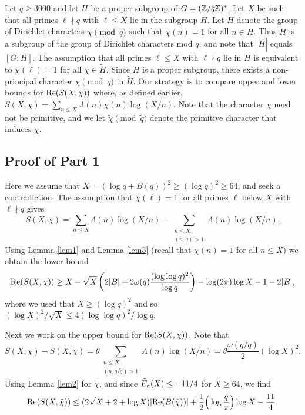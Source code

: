 \documentclass [12pt]{amsart}
\numberwithin{equation}{section}
\newcommand{\tRe}{\textup{Re}}
\begin{document}
Let $q\ge 3000$ and let $H$ be a proper subgroup of $G=({\Bbb Z}/q{\Bbb Z})^*$.  
Let $X$ be such that all primes $\ell \nmid q$ with $\ell \le X$ lie in the 
subgroup $H$.   
Let $\tilde H$ denote the group of Dirichlet characters $\chi \pmod q$ 
such that $\chi(n) =1$ for all $n \in H$.  Thus ${\tilde H}$ is a subgroup of 
the group of Dirichlet characters mod $q$, and note that $|{\tilde H}|$ equals 
$[G:H]$.  The assumption that all primes $\ell \le X$ with $\ell \nmid q$ 
lie in $H$ is equivalent to $\chi(\ell)=1$ for all $\chi \in {\tilde H}$.   Since $H$ is 
a proper subgroup, there exists a non-principal character $\chi \pmod q$ in ${\tilde H}$.  
Our strategy is to compare upper and lower bounds for $\tRe (S(X,\chi))$ where, 
as defined earlier, $S(X,\chi) = \sum_{n\le X} \Lambda(n) \chi(n) \log (X/n)$.  
Note that the character $\chi$ need not be primitive, and we let $\tilde \chi \pmod{\tilde q}$ 
denote the primitive character that induces $\chi$.   

 \subsection{Proof of Part 1}  Here we assume that 
 $X= (\log q+B(q))^2 \ge (\log q)^2 \ge 64$, and 
 seek a contradiction.  The assumption that $\chi(\ell)=1$ for all 
 primes $\ell$ below $X$ with $\ell\nmid q$  gives  
 $$ 
 S(X,\chi) = \sum_{n\le X} \Lambda(n) \log (X/n)  - \sum_{\substack{n\le X\\ (n,q)>1}} 
 \Lambda(n) \log (X/n).
 $$ 
 Using Lemma \ref{lem1} and Lemma \ref{lem5} (recall that $\chi(n) = 1$ for all $n\leq X$) we obtain the 
lower bound
\begin{equation} 
\label{lower2}
\tRe (S(X, \chi)) \geq X - \sqrt{X}\left(2|B|+2\omega(q)\frac{(\log\log q)^2}{\log q}\right) - \log (2\pi)\log X - 1 -2|B|,
\end{equation} 
where we used that $X\ge (\log q)^2$ and so $(\log X)^2/\sqrt{X} \le 4 (\log \log q)^2/\log q$.  

Next we work on the upper bound for $\tRe (S(X,\chi))$.  Note that 
\begin{equation} 
\label{eqn3.2} 
S(X,\chi) - S(X,\tilde\chi) = \theta \sum_{\substack {n\le X\\ (n,q/{\tilde q})>1} } 
\Lambda(n) \log(X/n) 
= \theta \frac{\omega(q/\tilde q)}{2} (\log X)^2. 
\end{equation}
Using Lemma \ref{lem2} for $\tilde \chi$,  and since ${\tilde E}_{\frak a}(X) \le -11/4$ for $X\ge 64$, 
we find 
\begin{equation} 
\label{eqn3.3} 
\tRe (S(X,\tilde \chi)) \le (2\sqrt{X}+2+\log X) |\tRe(B(\tilde \chi))| + 
\frac 12 \Big( \log \frac{\tilde q}{\pi} \Big) \log X - \frac{11}{4}. 
\end{equation}
\end{document}

